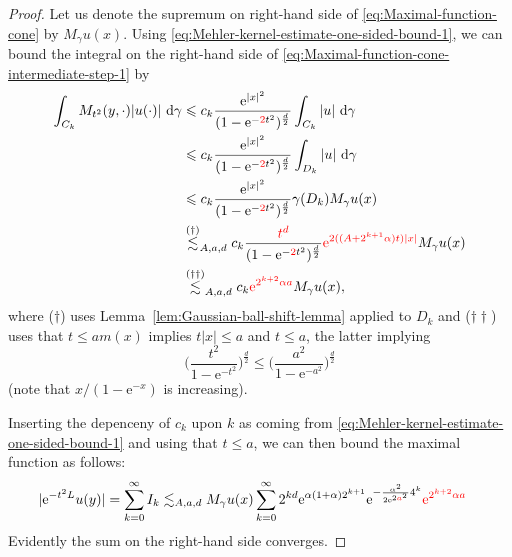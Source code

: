 \documentclass{amsart}
\theoremstyle{remark}
\newcommand{\D}{\,\textup{d}}
\renewcommand{\leq}{\leqslant}
\renewcommand{\leq}{\leqslant}
\newcommand{\e}{\mathrm{e}} %
\renewcommand{\leq}{\leqslant}%
\newcommand{\red}{\color{red}}
\begin{document}
\begin{proof}
  Let us denote the supremum on right-hand side of \eqref{eq:Maximal-function-cone} by $M_\gamma u (x)$.
  Using \eqref{eq:Mehler-kernel-estimate-one-sided-bound-1}, we can bound the integral on the right-hand side of
  \eqref{eq:Maximal-function-cone-intermediate-step-1} by 
  \begin{align*}
    \int_{C_k}  M_{t^2}(y, \cdot) |u(\cdot)| \,\D\gamma & \leq
    c_k \frac{\e^{|x|^2}}{(1 - \e^{-{\red 2}t^2})^{\frac{d}2}}   \int_{C_k}
    |u| \,\D\gamma\\ 
    &\leq c_k \frac {\e^{|x|^2}} {(1 -
      \e^{-{\red 2}t^2})^{\frac{d}2}} \int_{D_k} |u| \,\D\gamma\\ 
    &\leq c_k  \frac {\e^{|x|^2}}{(1 - \e^{-{\red 2}t^2})^{\frac{d}2}}  \gamma(D_k) M_\gamma u(x)\\
    &\overset{(\dagger)}{\lesssim}_{A,a,d} c_k 
    \frac {{\red t^d}}{(1 - \e^{-{\red 2}t^2})^{\frac{d}2}} {\red   \e^{2((A +2^{k + 1}\alpha)t)|x|}   }M_\gamma u(x)\\
    &\overset{(\dagger\dagger)}{\lesssim}_{A,a,d} c_k 
    {\red  \e^{2^{k + 2}\alpha a}   }M_\gamma u(x),
  \end{align*}
  where ($\dagger$) uses Lemma~\ref{lem:Gaussian-ball-shift-lemma} applied to
  $D_k$ and ($\dagger\dagger$) uses that $t \leq am(x)$ implies $t|x|\leq a$
  and $t\leq a$, the latter implying
  \begin{equation*}
    \biggl(\frac{t^2}{1 -
      \e^{-t^2}} \biggr)^{\frac{d}2} \leq
    \biggl(\frac{a^2}{1 -
      \e^{-a^2}} \biggr)^{\frac{d}2}
  \end{equation*}
  (note that $x/(1-\e^{-x})$ is increasing).
  

  Inserting the depenceny of $c_k$ upon $k$ as coming from 
  \eqref{eq:Mehler-kernel-estimate-one-sided-bound-1} and using that $t\leq a$, 
  we can then bound the maximal function as follows: 
  \begin{align*}
    |\e^{-t^2 L} u(y)| &= \sum_{k = 0}^\infty I_k
    \lesssim_{A,a,d} M_\gamma u(x) \sum_{k = 0}^\infty 2^{kd} \e^{\alpha(1+\alpha) 2^{k + 1}} 
    \e^{-\frac{\alpha^2}{2 \e^{2{\red a}^2}}  4^k}{\red \e^{ 2^{k + 2} \alpha a}}
  \end{align*}
  Evidently the sum on the right-hand side converges.
\end{proof} 
\end{document}
